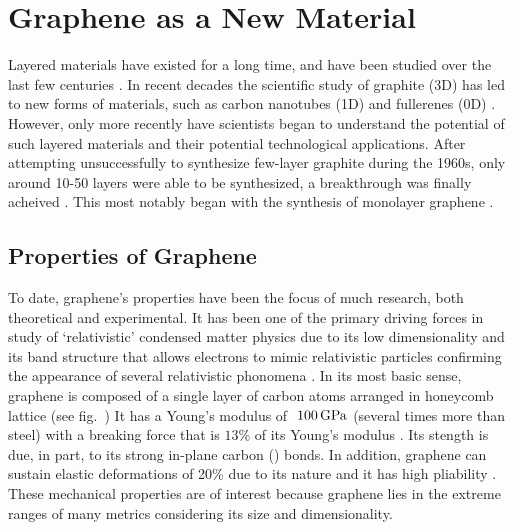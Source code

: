 \section{Graphene as a New \Td Material}\label{sec:graphene}
Layered materials have existed for a long time, and have been studied over the last few centuries \cite{Golden_EarthSci2013,Brodie_Royal1859}. In recent decades the scientific study of graphite (3D) has led to new forms of materials, such as carbon nanotubes (1D) and fullerenes (0D) \cite{Kroto_Nature1985, Balleste_Nanoscale2011,Iijima_Nature1991}. However, only more recently have scientists began to understand the potential of such layered materials and their potential technological applications. After attempting unsuccessfully to synthesize few-layer graphite during the 1960s, only around 10-50 layers were able to be synthesized, a breakthrough was finally acheived \cite{Balleste_Nanoscale2011}. This most notably began with the synthesis of monolayer graphene \cite{Novoselov_Science2004}.

\subsection{Properties of Graphene}\label{subsec:graphene_properties}
To date, graphene's properties have been the focus of much research, both theoretical and experimental. It has been one of the primary driving forces in study of `relativistic' condensed matter physics due to its low dimensionality and its band structure that allows electrons to mimic relativistic particles confirming the appearance of several relativistic phonomena \cite{Geim_NatureMat2007,Geim_Nature2005,Zhang_NatPhys2011,Williams_Science2007}. In its most basic sense, graphene is composed of a single layer of carbon atoms arranged in \td honeycomb lattice (see fig.~) It has a Young's modulus of $~100\,\mathrm{GPa}$ (several times more than steel) with a breaking force that is $13\%$ of its Young's modulus \cite{Bertolazzi_ACSnano2011, Akinwande_NatureComm2014}. Its stength is due, in part, to its strong in-plane carbon () bonds. In addition, graphene can sustain elastic deformations of 20\% due to its \td nature and it has high pliability \cite{Balleste_Nanoscale2011}. These mechanical properties are of interest because graphene lies in the extreme ranges of many metrics considering its size and dimensionality.\\


